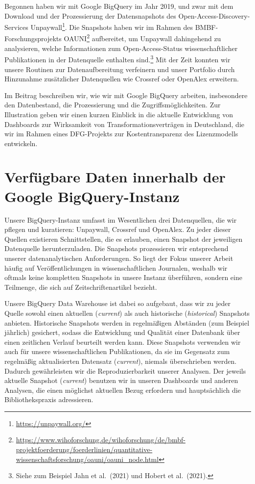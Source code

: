 \documentclass[a4paper,
fontsize=11pt,
oneside,
numbers=noperiodatend,
parskip=half-,
bibliography=totoc,
final
]{scrartcl}
\begin{document}
Begonnen haben wir mit Google BigQuery im Jahr 2019, und zwar mit dem
Download und der Prozessierung der Datensnapshots des
Open-Access-Discovery-Services Unpaywall\footnote{\url{https://unpaywall.org/}}.
Die Snapshots haben wir im Rahmen des BMBF-Forschungsprojekts
OAUNI\footnote{\url{https://www.wihoforschung.de/wihoforschung/de/bmbf-projektfoerderung/foerderlinien/quantitative-wissenschaftsforschung/oauni/oauni_node.html}}
aufbereitet, um Unpaywall dahingehend zu analysieren, welche
Informationen zum Open-Access-Status wissenschaftlicher Publikationen in
der Datenquelle enthalten sind.\footnote{Siehe zum Beispiel Jahn et
  al.~(2021) und Hobert et al.~(2021).} Mit der Zeit konnten wir unsere
Routinen zur Datenaufbereitung verfeinern und unser Portfolio durch
Hinzunahme zusätzlicher Datenquellen wie Crossref oder OpenAlex
erweitern.

Im Beitrag beschreiben wir, wie wir mit Google BigQuery arbeiten,
insbesondere den Datenbestand, die Prozessierung und die
Zugriffsmöglichkeiten. Zur Illustration geben wir einen kurzen Einblick
in die aktuelle Entwicklung von Dashboards zur Wirksamkeit von
Transformationsverträgen in Deutschland, die wir im Rahmen eines
DFG-Projekts zur Kostentransparenz des Lizenzmodells entwickeln.

\hypertarget{verfuxfcgbare-daten-innerhalb-der-google-bigquery-instanz}{%
\section{Verfügbare Daten innerhalb der Google
BigQuery-Instanz}\label{verfuxfcgbare-daten-innerhalb-der-google-bigquery-instanz}}

Unsere BigQuery-Instanz umfasst im Wesentlichen drei Datenquellen, die
wir pflegen und kuratieren: Unpaywall, Crossref und OpenAlex. Zu jeder
dieser Quellen existieren Schnittstellen, die es erlauben, einen
Snapshot der jeweiligen Datenquelle herunterzuladen. Die Snapshots
prozessieren wir entsprechend unserer datenanalytischen Anforderungen.
So liegt der Fokus unserer Arbeit häufig auf Veröffentlichungen in
wissenschaftlichen Journalen, weshalb wir oftmals keine kompletten
Snapshots in unsere Instanz überführen, sondern eine Teilmenge, die sich
auf Zeitschriftenartikel bezieht.

Unsere BigQuery Data Warehouse ist dabei so aufgebaut, dass wir zu jeder
Quelle sowohl einen aktuellen (\emph{current}) als auch historische
(\emph{historical}) Snapshots anbieten. Historische Snapshots werden in
regelmäßigen Abständen (zum Beispiel jährlich) gesichert, sodass die
Entwicklung und Qualität einer Datenbank über einen zeitlichen Verlauf
beurteilt werden kann. Diese Snapshots verwenden wir auch für unsere
wissenschaftlichen Publikationen, da sie im Gegensatz zum regelmäßig
aktualisierten Datensatz (\emph{current}), niemals überschrieben werden.
Dadurch gewährleisten wir die Reproduzierbarkeit unserer Analysen. Der
jeweils aktuelle Snapshot (\emph{current}) benutzen wir in unseren
Dashboards und anderen Analysen, die einen möglichst aktuellen Bezug
erfordern und hauptsächlich die Bibliothekspraxis adressieren.
\end{document}

